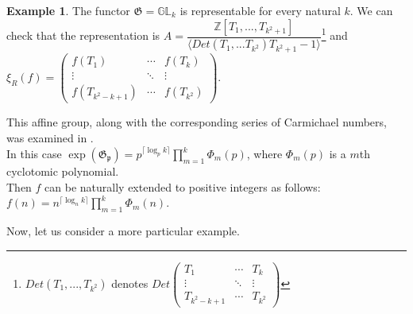 \documentclass{article}
\theoremstyle{definition}
\newtheorem{example}{Example}
\theoremstyle{definition}
\begin{document}
\begin{example}
The functor $\mathfrak {G} = \mathbb{GL}_{k}$ is representable for every natural $k.$ We can check that the representation is 
$A = \dfrac{\mathbb{Z}[T_1, ..., T_{k^2+1}]}{\langle Det(T_1, ... T_{k^2})T_{k^2+1}-1 \rangle}$\footnote{$Det(T_1, ..., T_{k^2})$ 
denotes $Det\begin{pmatrix}
  T_1 & \cdots & T_k\\
  \vdots & \ddots &  \vdots\\
  T_{k^2-k+1} & \cdots & T_{k^2} 
 \end{pmatrix}$} and $\xi_R(f)=\begin{pmatrix}
  f(T_1) & \cdots & f(T_k)\\
  \vdots & \ddots &  \vdots\\
  f(T_{k^2-k+1}) & \cdots & f(T_{k^2}) 
 \end{pmatrix}$.

This affine group, along with the corresponding series of Carmichael numbers, was examined in \cite{1}.\\

In this case $\operatorname{exp}(\mathfrak{G_p}) = p^{\lceil\log _p k\rceil} \prod_{m=1}^k \Phi_m(p)$, 
where $\Phi_m(p)$ is a $m$th cyclotomic polynomial.\\

Then $f$ can be naturally extended to positive integers as follows: $f(n) = n^{\lceil\log _n k\rceil} \prod_{m=1}^k \Phi_m(n)$.\\
\end{example}


Now, let us consider a more particular example.
\end{document}
